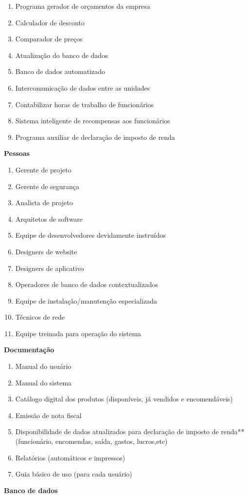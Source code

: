 \begin{enumerate}
	\item Programa gerador de orçamentos da empresa
	\item Calculador de desconto
	\item Comparador de preços 
	\item Atualização do banco de dados
	\item Banco de dados automatizado
	\item Intercomunicação de dados entre as unidades
	\item Contabilizar horas de trabalho de funcionários 
	\item Sistema inteligente de recompensas aos funcionários
	\item Programa auxiliar de declaração de imposto de renda
\end{enumerate}
\textbf{Pessoas}
\begin{enumerate}
	\item Gerente de projeto
	\item Gerente de segurança
	\item Analista de projeto
	\item Arquitetos de software
	\item Equipe de desenvolvedores devidamente instruídos
	\item Designers de website 
	\item Designers de aplicativo
	\item Operadores de banco de dados contextualizados
	\item Equipe de instalação/manutenção especializada
	\item Técnicos de rede 
	\item Equipe treinada para operação do sistema
\end{enumerate}
\textbf{Documentação}
\begin{enumerate}
	\item Manual do usuário
	\item Manual do sistema
	\item Catálogo digital dos produtos (disponíveis, já vendidos e encomendáveis)
	\item Emissão de nota fiscal 
	\item Disponibilidade de dados atualizados para declaração de imposto de renda**(funcionário, encomendas, saída, gastos, lucros,etc)
	\item Relatórios (automáticos e impressos)
	\item Guia básico de uso (para cada usuário)
\end{enumerate}
\textbf{Banco de dados}
